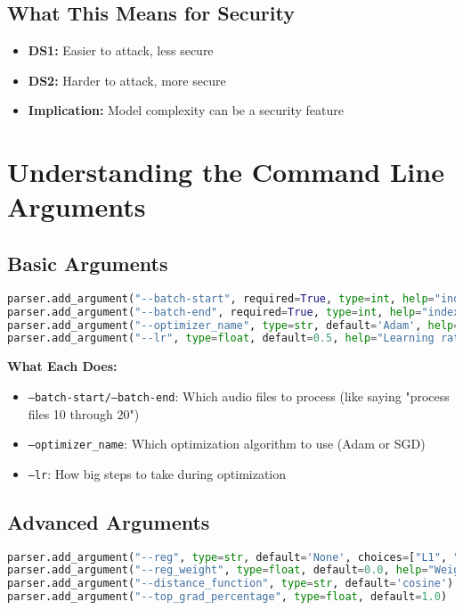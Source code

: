 \documentclass[12pt]{article}
\begin{document}
\subsection{What This Means for Security}

\begin{itemize}
    \item \textbf{DS1:} Easier to attack, less secure
    \item \textbf{DS2:} Harder to attack, more secure
    \item \textbf{Implication:} Model complexity can be a security feature
\end{itemize}

\section{Understanding the Command Line Arguments}

\subsection{Basic Arguments}

\begin{lstlisting}[language=Python, basicstyle=\small]
parser.add_argument("--batch-start", required=True, type=int, help="index of the start")
parser.add_argument("--batch-end", required=True, type=int, help="index of the end")
parser.add_argument("--optimizer_name", type=str, default='Adam', help="Optimizer to use")
parser.add_argument("--lr", type=float, default=0.5, help="Learning rate for optimization")
\end{lstlisting}

\textbf{What Each Does:}
\begin{itemize}
    \item \texttt{--batch-start/--batch-end}: Which audio files to process (like saying "process files 10 through 20")
    \item \texttt{--optimizer\_name}: Which optimization algorithm to use (Adam or SGD)
    \item \texttt{--lr}: How big steps to take during optimization
\end{itemize}

\subsection{Advanced Arguments}

\begin{lstlisting}[language=Python, basicstyle=\small]
parser.add_argument("--reg", type=str, default='None', choices=["L1", "L2", "TV", "None"])
parser.add_argument("--reg_weight", type=float, default=0.0, help="Weight of regularization")
parser.add_argument("--distance_function", type=str, default='cosine')
parser.add_argument("--top_grad_percentage", type=float, default=1.0)
\end{lstlisting}
\end{document}
